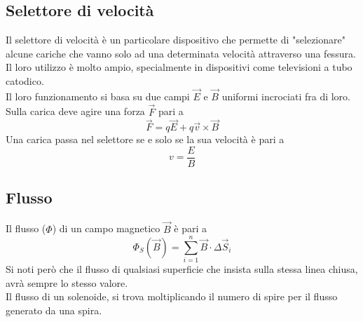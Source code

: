  \subsection{Selettore di velocità}
  Il selettore di velocità è un particolare dispositivo che permette di "selezionare" alcune cariche che
  vanno solo ad una determinata velocità attraverso una fessura. Il loro utilizzo è molto ampio, 
  specialmente in dispositivi come televisioni a tubo catodico.\\
  Il loro funzionamento si basa su due campi $\vec{E}$ e $\vec{B}$ uniformi incrociati fra di loro.\\
  Sulla carica deve agire una forza $\vec{F}$ pari a
  \begin{equation*}
    \vec{F} = q\vec{E} + q\vec{v}\times\vec{B}
  \end{equation*}
  Una carica passa nel selettore se e solo se la sua velocità è pari a
  \begin{equation*}
    v = \frac{E}{B}
  \end{equation*}

  \subsection{Flusso}
  Il flusso ($\Phi$) di un campo magnetico $\vec{B}$ è pari a 
  \begin{equation*}
    \Phi_S(\vec{B}) = \sum^n_{i=1} \vec{B}\cdot\Delta\vec{S}_i
  \end{equation*}
  Si noti però che il flusso di qualsiasi superficie che insista sulla stessa linea chiusa, avrà
  sempre lo stesso valore.\\
  Il flusso di un solenoide, si trova moltiplicando il numero di spire per il flusso generato da una
  spira.


